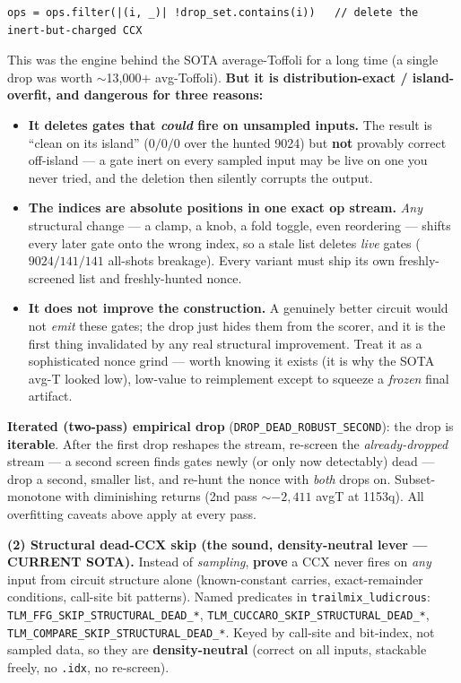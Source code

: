 \documentclass[11pt,a4paper]{article}
\begin{document}
\begin{lstlisting}
ops = ops.filter(|(i, _)| !drop_set.contains(i))   // delete the inert-but-charged CCX
\end{lstlisting}

This was the engine behind the SOTA average-Toffoli for a long time (a single drop was worth
$\sim$13{,}000$+$ avg-Toffoli). \textbf{But it is distribution-exact / island-overfit, and dangerous
for three reasons:}
\begin{itemize}
  \item \textbf{It deletes gates that \emph{could} fire on unsampled inputs.} The result is ``clean
    on its island'' ($0/0/0$ over the hunted 9024) but \textbf{not} provably correct off-island ---
    a gate inert on every sampled input may be live on one you never tried, and the deletion then
    silently corrupts the output.
  \item \textbf{The indices are absolute positions in one exact op stream.} \emph{Any} structural
    change --- a clamp, a knob, a fold toggle, even reordering --- shifts every later gate onto the
    wrong index, so a stale list deletes \emph{live} gates ($9024/141/141$ all-shots breakage). Every
    variant must ship its own freshly-screened list and freshly-hunted nonce.
  \item \textbf{It does not improve the construction.} A genuinely better circuit would not
    \emph{emit} these gates; the drop just hides them from the scorer, and it is the first thing
    invalidated by any real structural improvement. Treat it as a sophisticated nonce grind --- worth
    knowing it exists (it is why the SOTA avg-T looked low), low-value to reimplement except to
    squeeze a \emph{frozen} final artifact.
\end{itemize}

\textbf{Iterated (two-pass) empirical drop} (\texttt{DROP\_DEAD\_ROBUST\_SECOND}): the drop is
\textbf{iterable}. After the first drop reshapes the stream, re-screen the \emph{already-dropped}
stream --- a second screen finds gates newly (or only now detectably) dead --- drop a second, smaller
list, and re-hunt the nonce with \emph{both} drops on. Subset-monotone with diminishing returns (2nd
pass $\sim$$-2{,}411$ avgT at 1153q). All overfitting caveats above apply at every pass.

\textbf{(2) Structural dead-CCX skip (the sound, density-neutral lever --- CURRENT SOTA).} Instead of
\emph{sampling}, \textbf{prove} a CCX never fires on \emph{any} input from circuit structure alone
(known-constant carries, exact-remainder conditions, call-site bit patterns). Named predicates in
\texttt{trailmix\_ludicrous}: \texttt{TLM\_FFG\_SKIP\_STRUCTURAL\_DEAD\_*},
\texttt{TLM\_CUCCARO\_SKIP\_STRUCTURAL\_DEAD\_*}, \texttt{TLM\_COMPARE\_SKIP\_STRUCTURAL\_DEAD\_*}.
Keyed by call-site and bit-index, not sampled data, so they are \textbf{density-neutral} (correct on
all inputs, stackable freely, no \texttt{.idx}, no re-screen).
\end{document}
